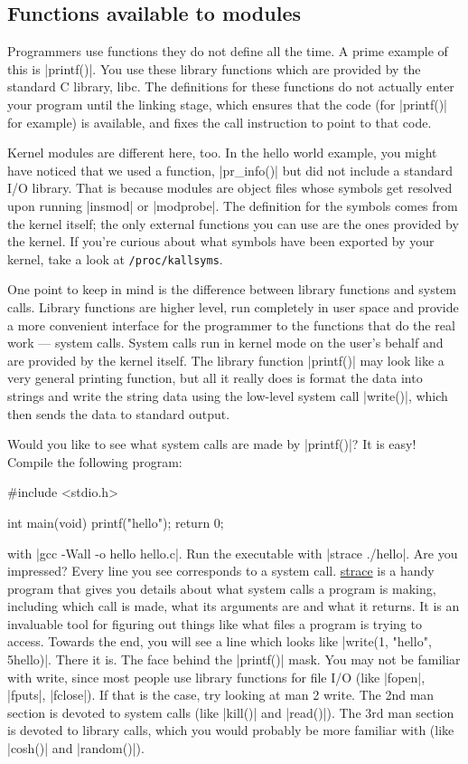 \documentclass[10pt, oneside]{book}
\begin{document}
\subsection{Functions available to modules}
\label{sec:avail_func}
Programmers use functions they do not define all the time.
A prime example of this is \cpp|printf()|.
You use these library functions which are provided by the standard C library, libc.
The definitions for these functions do not actually enter your program until the linking stage, which ensures that the code (for \cpp|printf()| for example) is available, and fixes the call instruction to point to that code.

Kernel modules are different here, too. In the hello world example, you might have noticed that we used a function, \cpp|pr_info()| but did not include a standard I/O library.
That is because modules are object files whose symbols get resolved upon running \sh|insmod| or \sh|modprobe|.
The definition for the symbols comes from the kernel itself; the only external functions you can use are the ones provided by the kernel.
If you're curious about what symbols have been exported by your kernel, take a look at \verb|/proc/kallsyms|.

One point to keep in mind is the difference between library functions and system calls. Library functions are higher level, run completely in user space and provide a more convenient interface for the programmer to the functions that do the real work --- system calls.
System calls run in kernel mode on the user's behalf and are provided by the kernel itself.
The library function \cpp|printf()| may look like a very general printing function, but all it really does is format the data into strings and write the string data using the low-level system call \cpp|write()|, which then sends the data to standard output.

Would you like to see what system calls are made by \cpp|printf()|?
It is easy!
Compile the following program:

\begin{code}
#include <stdio.h>

int main(void)
{
    printf("hello");
    return 0;
}
\end{code}

with \sh|gcc -Wall -o hello hello.c|.
Run the executable with \sh|strace ./hello|.
Are you impressed?
Every line you see corresponds to a system call.
\href{https://strace.io/}{strace} is a handy program that gives you details about what system calls a program is making, including which call is made, what its arguments are and what it returns.
It is an invaluable tool for figuring out things like what files a program is trying to access.
Towards the end, you will see a line which looks like \cpp|write(1, "hello", 5hello)|.
There it is.
The face behind the \cpp|printf()| mask.
You may not be familiar with write, since most people use library functions for file I/O (like \cpp|fopen|, \cpp|fputs|, \cpp|fclose|).
If that is the case, try looking at man 2 write.
The 2nd man section is devoted to system calls (like \cpp|kill()| and \cpp|read()|).
The 3rd man section is devoted to library calls, which you would probably be more familiar with (like \cpp|cosh()| and \cpp|random()|).
\end{document}
